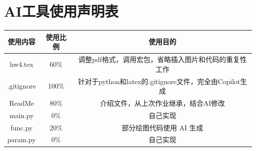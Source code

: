 \documentclass[UTF8]{ctexart}
\begin{document}
\newpage
\appendix
\section{AI工具使用声明表}
\begin{table}[H]
    \centering
    \begin{tabular}{c|c|c}
        \hline
        使用内容 & 使用比例 & 使用目的 \\ \hline
        hw4.tex & 60\% & 调整pdf格式，调用宏包，省略插入图片和代码的重复性工作 \\ 
        .gitignore & 100\% & 针对于python和latex的.gitignore文件，完全由Copilot生成  \\
        ReadMe & 80\% & 介绍文件，从上次作业继承，结合AI修改 \\
        main.py & 0\% & 自己实现  \\
        func.py & 20\% & 部分绘图代码使用 AI 生成 \\
        param.py & 0\% & 自己实现 \\
        \hline
    \end{tabular}
    \label{tab:AI_tools}
\end{table}
\end{document}
